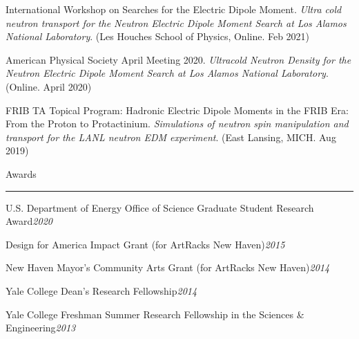 \begin{singlespace}
{International Workshop on Searches for the Electric Dipole Moment. \textit{Ultra cold neutron transport for the Neutron Electric Dipole Moment Search at Los Alamos National Laboratory}. (Les Houches School of Physics, Online. Feb 2021)

\vspace{0.25\baselineskip}

American Physical Society April Meeting 2020. \textit{Ultracold Neutron Density for the Neutron Electric Dipole Moment Search at Los Alamos National Laboratory}. (Online. April 2020)

\vspace{0.25\baselineskip}

FRIB TA Topical Program: Hadronic Electric Dipole Moments in the FRIB Era: From the Proton to Protactinium. \textit{Simulations of neutron spin manipulation and transport for the LANL neutron EDM experiment}. (East Lansing, MICH. Aug 2019) 

\vspace{\baselineskip}
{\large Awards}\vspace{0.25\baselineskip}\hrule\vspace{0.75\baselineskip}

U.S. Department of Energy Office of Science Graduate Student Research Award\hfill\textit{2020}

\vspace{0.25\baselineskip}

Design for America Impact Grant (for ArtRacks New Haven)\hfill\textit{2015}

\vspace{0.25\baselineskip}

New Haven Mayor's Community Arts Grant (for ArtRacks New Haven)\hfill\textit{2014}

\vspace{0.25\baselineskip}

Yale College Dean's Research Fellowship\hfill\textit{2014}

\vspace{0.25\baselineskip}

Yale College Freshman Summer Research Fellowship in the Sciences \& Engineering\hfill\textit{2013}


} %
\end{singlespace}
